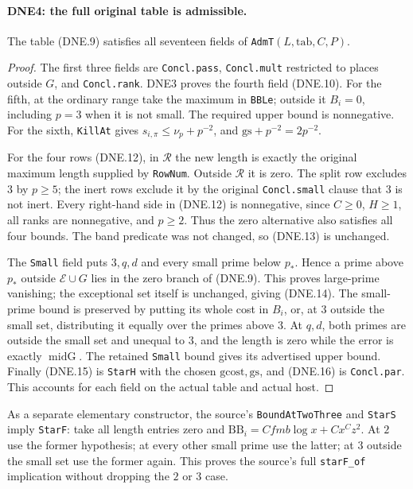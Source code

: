 \documentclass[11pt,a4paper]{article}
\numberwithin{equation}{section}
\theoremstyle{remark}\newtheorem{remark}[theorem]{Remark}
\begin{document}
\paragraph{DNE4: the full original table is admissible.}
\label{claim:DNE4}
The table (DNE.9) satisfies all seventeen fields of
\texttt{Adm\allowbreak T}$(L,\mathrm{tab},C,P)$.

\begin{proof}
The first three fields are \texttt{Concl.\allowbreak pass},
\texttt{Concl.\allowbreak mult} restricted to places outside $G$, and
\texttt{Concl.\allowbreak rank}.  DNE3 proves the fourth field (DNE.10).
For the fifth, at the ordinary range take the maximum in
\texttt{BBLe}; outside it $B_i=0$, including $p=3$ when it is not
small.  The required upper bound is nonnegative.  For the sixth,
\texttt{Kill\allowbreak At} gives $s_{i,\pi}\le\nu_p+p^{-2}$, and
$\mathrm{gs}+p^{-2}=2p^{-2}$.

For the four rows (DNE.12), in $\mathcal R$ the new length is
exactly the original maximum length supplied by \texttt{Row\allowbreak Num}.
Outside $\mathcal R$ it is zero.  The split row excludes $3$
by $p\ge5$; the inert rows exclude it by the original
\texttt{Concl.\allowbreak small} clause that $3$ is not inert.  Every
right-hand side in (DNE.12) is nonnegative, since $C\ge0$,
$H\ge1$, all ranks are nonnegative, and $p\ge2$.
Thus the zero alternative also satisfies all four bounds.
The band predicate was not changed, so (DNE.13) is unchanged.

The \texttt{Small} field puts $3,q,d$ and every small prime below
$p_*$.  Hence a prime above $p_*$ outside $\mathcal E\cup G$ lies
in the zero branch of (DNE.9).  This proves large-prime vanishing;
the exceptional set itself is unchanged, giving (DNE.14).
The small-prime bound is preserved by putting its whole cost in
$B_i$, or, at $3$ outside the small set, distributing it equally
over the primes above $3$.  At $q,d$, both primes are outside the
small set and unequal to $3$, and the length is zero while the
error is exactly $\operatorname{midG}$.  The retained
\texttt{Small} bound gives its advertised upper bound.
Finally (DNE.15) is \texttt{Star\allowbreak H} with the chosen
$\mathrm{gcost},\mathrm{gs}$, and (DNE.16) is
\texttt{Concl.\allowbreak par}.  This accounts for each field on the actual
table and actual host.
\end{proof}

As a separate elementary constructor, the source's
\texttt{Bound\allowbreak At\allowbreak Two\allowbreak Three} and \texttt{Star\allowbreak S} imply \texttt{Star\allowbreak F}:
take all length entries zero and $\mathrm{BB}_i=Cfm b\log x+Cx^Cz^2$.
At $2$ use the former hypothesis; at every other small prime use
the latter; at $3$ outside the small set use the former again.
This proves the source's full \texttt{star\allowbreak F\_\allowbreak of} implication
without dropping the $2$ or $3$ case.
\end{document}
